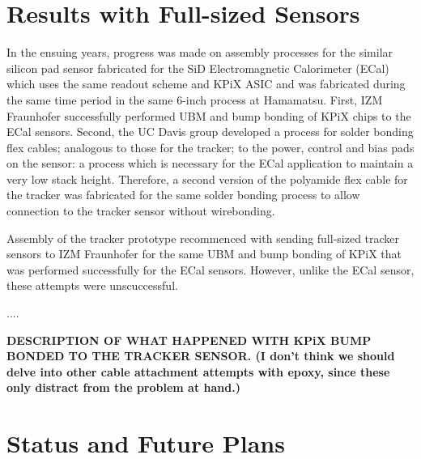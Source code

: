 \documentclass[prc,12pt,nofootinbib,letterpaper]{revtex4}
\begin{document}
\section{Results with Full-sized Sensors}

In the ensuing years, progress was made on assembly processes for the similar silicon pad sensor fabricated for the SiD Electromagnetic Calorimeter (ECal) which uses the same readout scheme and KPiX ASIC and was fabricated during the same time period in the same 6-inch process at Hamamatsu.  First, IZM Fraunhofer successfully performed UBM and bump bonding of KPiX chips to the ECal sensors.  Second, the UC Davis group developed a process for solder bonding flex cables; analogous to those for the tracker; to the power, control and bias pads on the sensor: a process which is necessary for the ECal application to maintain a very low stack height.  Therefore, a second version of the polyamide flex cable for the tracker was fabricated for the same solder bonding process to allow connection to the tracker sensor without wirebonding.  

Assembly of the tracker prototype recommenced with sending full-sized tracker sensors to IZM Fraunhofer for the same UBM and bump bonding of KPiX that was performed successfully for the ECal sensors.  However, unlike the ECal sensor, these attempts were unscuccessful.

....

\textbf{DESCRIPTION OF WHAT HAPPENED WITH KPiX BUMP BONDED TO THE TRACKER SENSOR.  (I don't think we should delve into other cable attachment attempts with epoxy, since these only distract from the problem at hand.)}

\section{Status and Future Plans}
\end{document}
